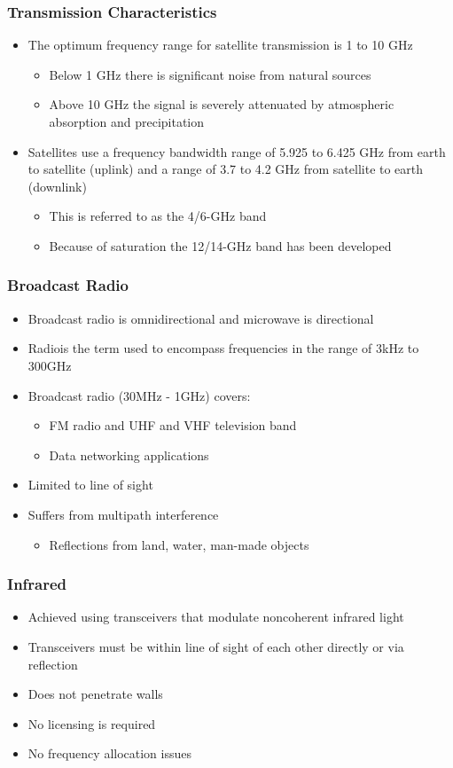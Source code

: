 \documentclass[pdflatex,compress]{beamer}
\begin{document}
\begin{frame}
	\frametitle{Transmission Characteristics}
	\begin{itemize}
		\item The optimum frequency range for satellite transmission is 1 to 10 GHz
		\begin{itemize}
			\item Below 1 GHz there is significant noise from natural sources
			\item Above 10 GHz the signal is severely attenuated by atmospheric absorption and precipitation
		\end{itemize}
		\item Satellites use a frequency bandwidth range of 5.925 to 6.425 GHz from earth to satellite (uplink) and a range of 3.7 to 4.2 GHz from satellite to earth (downlink)
		\begin{itemize}
			\item This is referred to as the 4/6-GHz band
			\item Because of saturation the 12/14-GHz band has been developed
		\end{itemize}
	\end{itemize}
\end{frame}

\begin{frame}
	\frametitle{Broadcast Radio}
	\begin{itemize}
		\item Broadcast radio is omnidirectional and microwave is directional
		\item Radiois the term used to encompass frequencies in the range of 3kHz to 300GHz
		\item Broadcast radio (30MHz - 1GHz) covers:
		\begin{itemize}
			\item FM radio and UHF and VHF television band
			\item Data networking applications
		\end{itemize}
		\item Limited to
		line of sight
		\item Suffers from multipath interference
		\begin{itemize}
			\item Reflections from land, water, man-made objects
		\end{itemize}
	\end{itemize}
\end{frame}

\begin{frame}
	\frametitle{Infrared}
	\begin{itemize}
		\item Achieved using transceivers that modulate noncoherent infrared light
		\item Transceivers must be within line of sight of each other directly or via reflection
		\item Does not penetrate walls
		\item No licensing is required
		\item No frequency allocation issues
	\end{itemize}
\end{frame}
\end{document}

